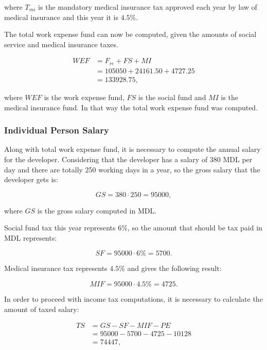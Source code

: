 \noindent where $T_{mi}$ is the mandatory medical insurance tax approved each
year by law of medical insurance and this year it is $4.5\%$.

The total work expense fund can now be computed, given the amounts of social
service and medical insurance taxes.

\begin{equation}
\begin{split}
 WEF &= F_{re} + FS + MI\\
     &= 105050 + 24161.50 + 4727.25\\
     &= 133928.75,
\end{split}
\end{equation}

\noindent where $WEF$ is the work expense fund, $FS$ is the social fund and $MI$
is the medical insurance fund. In that way the total work expense fund was
computed.


\subsubsection{Individual Person Salary}

Along with total work expense fund, it is necessary to compute the annual
salary for the developer. Considering that the developer has a salary of 380
MDL per day and there are totally 250 working days in a year, so the gross
salary that the developer gets is:

\begin{equation}
GS = 380 \cdot 250 = 95000,
\end{equation}

\noindent where $GS$ is the gross salary computed in MDL.

Social fund tax this year represents $6\%$, so the amount that should be tax
paid in MDL represents:

\begin{equation}
 SF = 95000 \cdot 6\% = 5700.
\end{equation}

Medical insurance tax represents $4.5\%$ and gives the following result:

\begin{equation}
 MIF = 95000 \cdot 4.5\% = 4725.
\end{equation}

In order to proceed with income tax computations, it is necessary to calculate
the amount of taxed salary:

\begin{equation}
\begin{split}
 TS &= GS - SF - MIF - PE \\
              &= 95000 - 5700 - 4725 - 10128\\
              &= 74447,
\end{split}
\end{equation}

